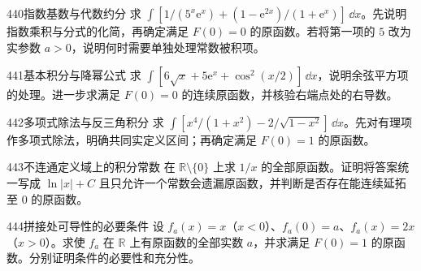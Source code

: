 \begin{exercise}{440}{指数基数与代数约分}
求 $\int[1/(5^x\mathrm e^x)+(1-\mathrm e^{2x})/(1+\mathrm e^x)]\,\dd x$。先说明指数乘积与分式的化简，再确定满足 $F(0)=0$ 的原函数。若将第一项的 $5$ 改为实参数 $a>0$，说明何时需要单独处理常数被积项。
\end{exercise}
\begin{exercise}{441}{基本积分与降幂公式}
求 $\int[6\sqrt x+5\mathrm e^x+\cos^2(x/2)]\,\dd x$，说明余弦平方项的处理。进一步求满足 $F(0)=0$ 的连续原函数，并核验右端点处的右导数。
\end{exercise}
\begin{exercise}{442}{多项式除法与反三角积分}
求 $\int[x^4/(1+x^2)-2/\sqrt{1-x^2}]\,\dd x$。先对有理项作多项式除法，明确共同实定义区间；再确定满足 $F(0)=1$ 的原函数。
\end{exercise}
\begin{exercise}{443}{不连通定义域上的积分常数}
在 $\mathbb R\setminus\{0\}$ 上求 $1/x$ 的全部原函数。证明将答案统一写成 $\ln|x|+C$ 且只允许一个常数会遗漏原函数，并判断是否存在能连续延拓至 $0$ 的原函数。
\end{exercise}
\begin{exercise}{444}{拼接处可导性的必要条件}
设 $f_a(x)=x$（$x<0$）、$f_a(0)=a$、$f_a(x)=2x$（$x>0$）。求使 $f_a$ 在 $\mathbb R$ 上有原函数的全部实数 $a$，并求满足 $F(0)=1$ 的原函数。分别证明条件的必要性和充分性。
\end{exercise}
